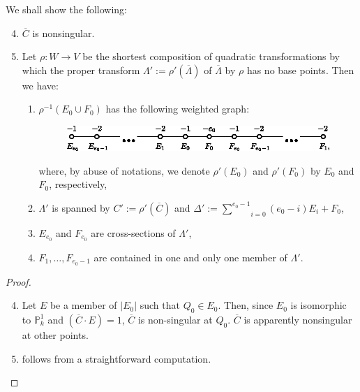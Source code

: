 We shall show the following:

\begin{lemma*}
\begin{enumerate}
\setcounter{enumi}{3}
\renewcommand{\labelenumi}{\rm(\theenumi)}
\item $\overline{C}$ is nonsingular.

\item Let $\rho:W\to V$ be the shortest composition of quadratic
  transformations by which the proper transform
  $\Lambda':=\rho'(\overline{\Lambda})$ of $\overline{\Lambda}$ by
  $\rho$ has no base points. Then we have:
\begin{enumerate}
\renewcommand{\theenumii}{\roman{enumii}}
\renewcommand{\labelenumii}{\rm(\theenumii)}
\item $\rho^{-1}(E_{0}\cup F_{0})$ has the following weighted graph:
\begin{figure}[H]
\centering
\includegraphics[scale=1.1]{figures/chap2-fig33.eps}
\end{figure}
\noindent
where, by abuse of notations, we denote $\rho'(E_{0})$ and
$\rho'(F_{0})$ by $E_{0}$ and $F_{0}$, respectively,

\item $\Lambda'$ is spanned by $C':=\rho'(\overline{C})$ and
  $\Delta':={\displaystyle{\mathop{\sum}^{e_{0}-1}}_{i=0}}(e_{0}-i)E_{i}+F_{0}$, 

\item $E_{e_{0}}$ and $F_{e_{0}}$ are cross-sections of $\Lambda'$,

\item $F_{1},\ldots,F_{e_{0}-1}$ are contained in one and only one
  member of $\Lambda'$.
\end{enumerate}
\end{enumerate}
\end{lemma*}

\begin{proof}
\begin{enumerate}
\setcounter{enumi}{3}
\renewcommand{\labelenumi}{\rm(\theenumi)}
\item Let $E$ be a member of $|E_{0}|$ such that $Q_{0}\in
  E_{0}$. Then, since $E_{0}$ is isomorphic to $\mathbb{P}^{1}_{k}$
  and $(\overline{C}\cdot E)=1$, $\overline{C}$ is non-singular at
  $Q_{0}$. $\overline{C}$ is apparently nonsingular at other points.

\item follows from a straightforward computation.
\end{enumerate}
\end{proof}

